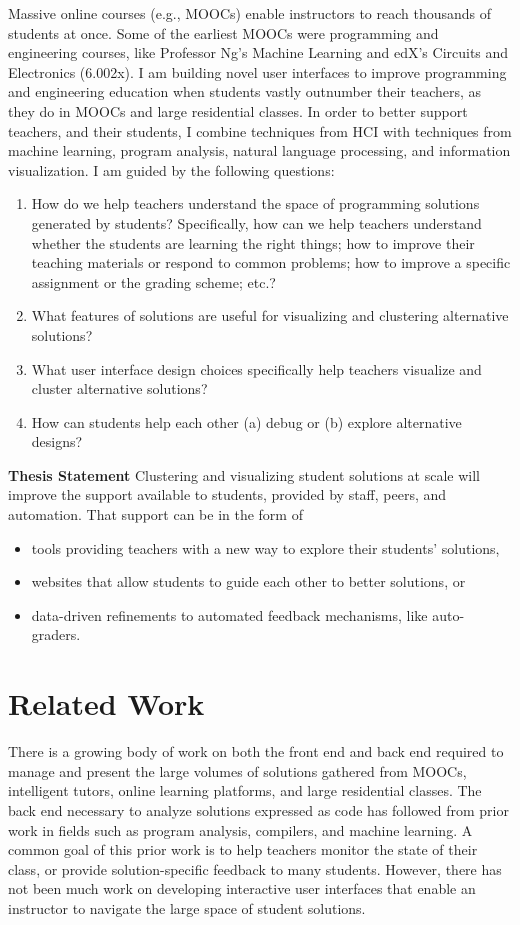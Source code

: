 \documentclass{sigchi}
\begin{document}
Massive online courses (e.g., MOOCs) enable instructors to reach thousands of students at once. Some of the earliest MOOCs were programming and engineering courses, like Professor Ng's Machine Learning and edX's Circuits and Electronics (6.002x). I am building novel user interfaces to improve programming and engineering education when students vastly outnumber their teachers, as they do in MOOCs and large residential classes. In order to better support teachers, and their students, I combine techniques from HCI with techniques from machine learning, program analysis, natural language processing, and information visualization. I am guided by the following questions:
\begin{enumerate}
\item How do we help teachers understand the space of programming solutions generated by students? Specifically, how can we help teachers understand whether the students are learning the right things; how to improve their teaching materials or respond to common problems; how to improve a specific assignment or the grading scheme; etc.?
\item What features of solutions are useful for visualizing and clustering alternative solutions?
\item What user interface design choices specifically help teachers visualize and cluster alternative solutions?
\item How can students help each other (a) debug or (b) explore alternative designs?
\end{enumerate}

{\bf Thesis Statement} Clustering and visualizing student solutions at scale will improve the support available to students, provided by staff, peers, and automation. That support can be in the form of 
\begin{itemize}
\item tools providing teachers with a new way to explore their students' solutions,
\item websites that allow students to guide each other to better solutions, or 
\item data-driven refinements to automated feedback mechanisms, like auto-graders. 
\end{itemize}

\section{Related Work}

There is a growing body of work on both the front end and back end required to manage and present the large volumes of solutions gathered from MOOCs, intelligent tutors, online learning platforms, and large residential classes. The back end necessary to analyze solutions expressed as code has followed from prior work in fields such as program analysis, compilers, and machine learning. A common goal of this prior work is to help teachers monitor the state of their class, or provide solution-specific feedback to many students. However, there has not been much work on developing interactive user interfaces that enable an instructor to navigate the large space of student solutions.
\end{document}
